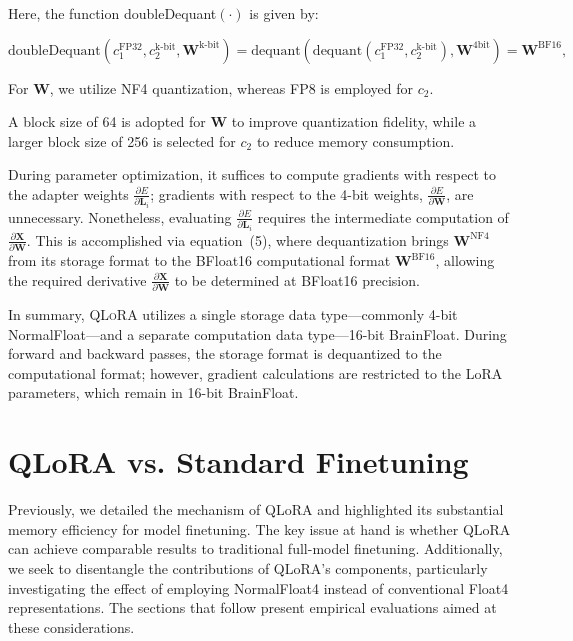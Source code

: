 Here, the function doubleDequant$(\cdot)$ is given by:

\begin{equation}
    \text{doubleDequant}(c_1^{\text{FP32}}, c_2^{\text{k-bit}}, \mathbf{W}^{\text{k-bit}}) = \text{dequant}(\text{dequant}(c_1^{\text{FP32}}, c_2^{\text{k-bit}}), \mathbf{W}^{\text{4bit}}) = \mathbf{W}^{\text{BF16}},
\end{equation}

For $\mathbf{W}$, we utilize NF4 quantization, whereas FP8 is employed for $c_2$.

A block size of 64 is adopted for $\mathbf{W}$ to improve quantization fidelity, while a larger block size of 256 is selected for $c_2$ to reduce memory consumption.

During parameter optimization, it suffices to compute gradients with respect to the adapter weights $\frac{\partial E}{\partial \mathbf{L}_i}$; gradients with respect to the 4-bit weights, $\frac{\partial E}{\partial \mathbf{W}}$, are unnecessary. Nonetheless, evaluating $\frac{\partial E}{\partial \mathbf{L}_i}$ requires the intermediate computation of $\frac{\partial \mathbf{X}}{\partial \mathbf{W}}$. This is accomplished via equation~(5), where dequantization brings $\mathbf{W}^{\text{NF4}}$ from its storage format to the BFloat16 computational format $\mathbf{W}^{\text{BF16}}$, allowing the required derivative $\frac{\partial \mathbf{X}}{\partial \mathbf{W}}$ to be determined at BFloat16 precision.

In summary, \textsc{QLoRA} utilizes a single storage data type—commonly 4-bit NormalFloat—and a separate computation data type—16-bit BrainFloat. During forward and backward passes, the storage format is dequantized to the computational format; however, gradient calculations are restricted to the LoRA parameters, which remain in 16-bit BrainFloat.

\section{QLoRA vs. Standard Finetuning}
\label{sec:comp_to_std}

Previously, we detailed the mechanism of QLoRA and highlighted its substantial memory efficiency for model finetuning. The key issue at hand is whether QLoRA can achieve comparable results to traditional full-model finetuning. Additionally, we seek to disentangle the contributions of QLoRA’s components, particularly investigating the effect of employing NormalFloat4 instead of conventional Float4 representations. The sections that follow present empirical evaluations aimed at these considerations.


